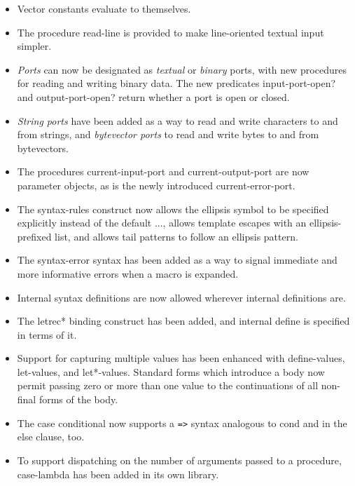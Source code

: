 \begin{itemize}
\item Vector constants evaluate to themselves.

\item The procedure {\cf read-line} is provided to make line-oriented textual input
simpler.

\item {\em Ports} can now be designated as {\em textual} or {\em
binary} ports, with new procedures for reading and writing binary
data.
The new predicates {\cf input-port-open?} and {\cf output-port-open?} return whether a port is open or closed.

\item {\em String ports} have been added as a way to read and write
characters to and from strings, and {\em bytevector ports} to read
and write bytes to and from bytevectors.

\item The procedures {\cf current-input-port} and {\cf current-output-port} are now
parameter objects, as is the newly introduced {\cf
current-error-port}.

\item The {\cf syntax-rules} construct now allows
the ellipsis symbol to be specified explicitly instead of the default
{\cf ...}, allows template escapes with an ellipsis-prefixed list, and
allows tail patterns to follow an ellipsis pattern.

\item The {\cf syntax-error} syntax has been added as a way to signal immediate
and more informative errors when a macro is expanded.

\item Internal syntax definitions are now allowed wherever
internal definitions are.

\item The {\cf letrec*} binding construct has been added, and internal {\cf define} 
is specified in terms of it.

\item Support for capturing multiple values has been enhanced with {\cf
define-values}, {\cf let-values}, and {\cf let*-values}.
Standard forms which introduce a body now permit passing zero or more than
one value to the continuations of all non-final forms of the body.

\item The {\cf case} conditional now supports a {\tt =>} syntax
analogous to {\cf cond} and in the {\cf else} clause, too.

\item To support dispatching on the number of arguments passed to a
procedure, {\cf case-lambda} has been added in its own library.


\end{itemize}
